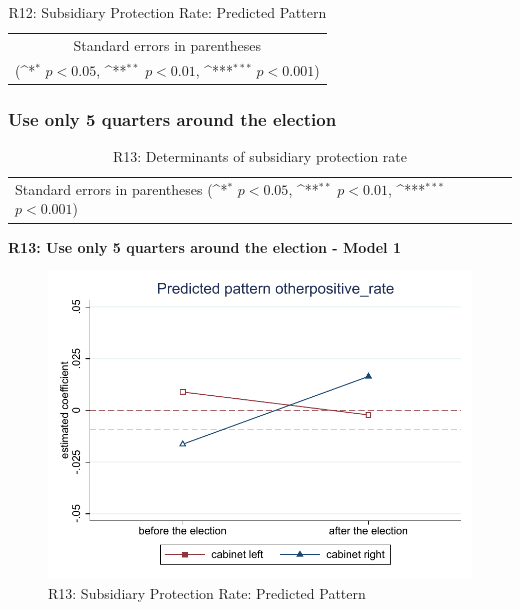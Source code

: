 \documentclass[10pt,a4paper]{scrartcl}
\begin{document}
\begin{table}[!ht]\centering
	\footnotesize
	\renewcommand{\arraystretch}{1.2}
	\def\sym#1{\ifmmode^{#1}\else\(^{#1}\)\fi}
	\caption{R12: Subsidiary Protection Rate: Predicted Pattern}
	\begin{tabular}{l*{2}{c}}
		\hline\hline
		
		\hline\hline
		\multicolumn{3}{c}{\footnotesize Standard errors in parentheses} \\
		\multicolumn{3}{c}{\footnotesize (\sym{*} \(p<0.05\), \sym{**} \(p<0.01\), \sym{***} \(p<0.001\))} \\
	\end{tabular}
\end{table}





\clearpage
\FloatBarrier
\subsubsection{Use only 5 quarters around the election}
\begin{table}[!ht]\centering
	\renewcommand{\arraystretch}{1.25}
	\small
	\def\sym#1{\ifmmode^{#1}\else\(^{#1}\)\fi}
	\caption{R13: Determinants of subsidiary protection rate}
	\begin{tabular}{l*{3}{c}}
		\hline\hline
		
		\hline\hline
		\multicolumn{4}{l}{\footnotesize Standard errors in parentheses (\sym{*} \(p<0.05\), \sym{**} \(p<0.01\), \sym{***} \(p<0.001\))}\\
	\end{tabular}
\end{table}

\clearpage
\textbf{R13: Use only 5 quarters around the election - Model 1}
\begin{figure}[!ht]
	\centering
	\includegraphics[width=1\textwidth]{figures_edited/otherpositive_rate_graph1_R13.pdf}
	\caption{R13: Subsidiary Protection Rate: Predicted Pattern}
\end{figure}
\end{document}
